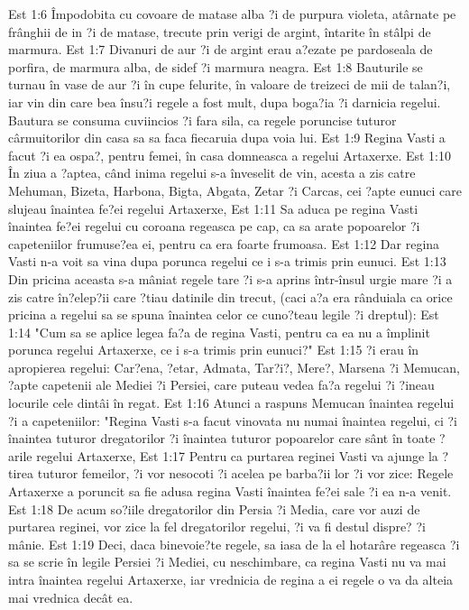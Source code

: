 Est 1:6  Împodobita cu covoare de matase alba ?i de purpura violeta, atârnate pe frânghii de in ?i de matase, trecute prin verigi de argint, întarite în stâlpi de marmura.
Est 1:7  Divanuri de aur ?i de argint erau a?ezate pe pardoseala de porfira, de marmura alba, de sidef ?i marmura neagra.
Est 1:8  Bauturile se turnau în vase de aur ?i în cupe felurite, în valoare de treizeci de mii de talan?i, iar vin din care bea însu?i regele a fost mult, dupa boga?ia ?i darnicia regelui. Bautura se consuma cuviincios ?i fara sila, ca regele poruncise tuturor cârmuitorilor din casa sa sa faca fiecaruia dupa voia lui.
Est 1:9  Regina Vasti a facut ?i ea ospa?, pentru femei, în casa domneasca a regelui Artaxerxe.
Est 1:10  În ziua a ?aptea, când inima regelui s-a înveselit de vin, acesta a zis catre Mehuman, Bizeta, Harbona, Bigta, Abgata, Zetar ?i Carcas, cei ?apte eunuci care slujeau înaintea fe?ei regelui Artaxerxe,
Est 1:11  Sa aduca pe regina Vasti înaintea fe?ei regelui cu coroana regeasca pe cap, ca sa arate popoarelor ?i capeteniilor frumuse?ea ei, pentru ca era foarte frumoasa.
Est 1:12  Dar regina Vasti n-a voit sa vina dupa porunca regelui ce i s-a trimis prin eunuci.
Est 1:13  Din pricina aceasta s-a mâniat regele tare ?i s-a aprins într-însul urgie mare ?i a zis catre în?elep?ii care ?tiau datinile din trecut, (caci a?a era rânduiala ca orice pricina a regelui sa se spuna înaintea celor ce cuno?teau legile ?i dreptul):
Est 1:14  "Cum sa se aplice legea fa?a de regina Vasti, pentru ca ea nu a împlinit porunca regelui Artaxerxe, ce i s-a trimis prin eunuci?"
Est 1:15  ?i erau în apropierea regelui: Car?ena, ?etar, Admata, Tar?i?, Mere?, Marsena ?i Memucan, ?apte capetenii ale Mediei ?i Persiei, care puteau vedea fa?a regelui ?i ?ineau locurile cele dintâi în regat.
Est 1:16  Atunci a raspuns Memucan înaintea regelui ?i a capeteniilor: "Regina Vasti s-a facut vinovata nu numai înaintea regelui, ci ?i înaintea tuturor dregatorilor ?i înaintea tuturor popoarelor care sânt în toate ?arile regelui Artaxerxe,
Est 1:17  Pentru ca purtarea reginei Vasti va ajunge la ?tirea tuturor femeilor, ?i vor nesocoti ?i acelea pe barba?ii lor ?i vor zice: Regele Artaxerxe a poruncit sa fie adusa regina Vasti înaintea fe?ei sale ?i ea n-a venit.
Est 1:18  De acum so?iile dregatorilor din Persia ?i Media, care vor auzi de purtarea reginei, vor zice la fel dregatorilor regelui, ?i va fi destul dispre? ?i mânie.
Est 1:19  Deci, daca binevoie?te regele, sa iasa de la el hotarâre regeasca ?i sa se scrie în legile Persiei ?i Mediei, cu neschimbare, ca regina Vasti nu va mai intra înaintea regelui Artaxerxe, iar vrednicia de regina a ei regele o va da alteia mai vrednica decât ea.
